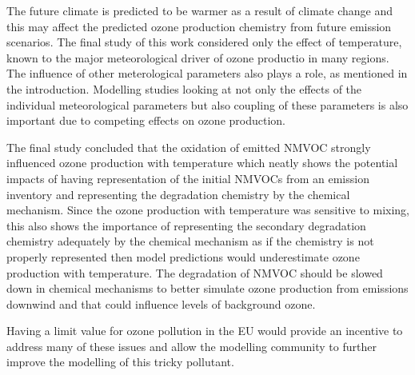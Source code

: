 The future climate is predicted to be warmer as a result of climate change and this may affect the predicted ozone production chemistry from future emission scenarios.
The final study of this work considered only the effect of temperature, known to the major meteorological driver of ozone productio in many regions.
The influence of other meterological parameters also plays a role, as mentioned in the introduction.
Modelling studies looking at not only the effects of the individual meteorological parameters but also coupling of these parameters is also important due to competing effects on ozone production.

The final study concluded that the oxidation of emitted NMVOC strongly influenced ozone production with temperature which neatly shows the potential impacts of having representation of the initial NMVOCs from an emission inventory and representing the degradation chemistry by the chemical mechanism.
Since the ozone production with temperature was sensitive to mixing, this also shows the importance of representing the secondary degradation chemistry adequately by the chemical mechanism as if the chemistry is not properly represented then model predictions would underestimate ozone production with temperature.
The degradation of NMVOC should be slowed down in chemical mechanisms to better simulate ozone production from emissions downwind and that could influence levels of background ozone.

Having a limit value for ozone pollution in the EU would provide an incentive to address many of these issues and allow the modelling community to further improve the modelling of this tricky pollutant.
